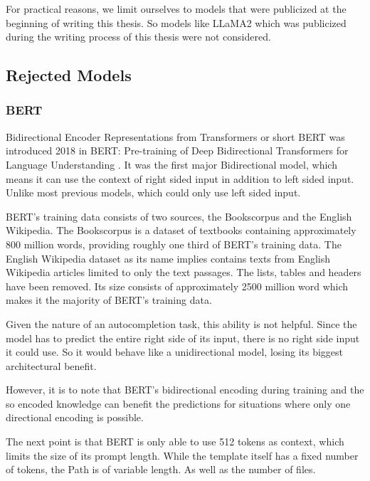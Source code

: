 For practical reasons, we limit ourselves to models that were publicized at the beginning of writing this thesis. So models like LLaMA2 which was publicized during the writing process of this thesis were not considered.



\subsection{Rejected Models}


\subsubsection{BERT}
Bidirectional Encoder Representations from Transformers or short BERT was introduced  2018  in BERT: Pre-training of Deep Bidirectional Transformers for
Language Understanding \cite{devlin2019bert}. It was the first major Bidirectional model, which means it can use the context of right sided input in addition to left sided input. Unlike most previous models, which could only use left sided input.

 
 BERT's training data consists of two sources, the Bookscorpus and the English Wikipedia. The Bookscorpus is a dataset of textbooks containing approximately 800 million words, providing roughly one third of BERT's training data. The English Wikipedia dataset as its name implies contains texts from English Wikipedia articles limited to only the text passages. The lists, tables and headers have been removed.
Its size consists of approximately 2500 million word which makes it the majority of BERT's training data. \cite{devlin2019bert}


 Given the nature of an autocompletion task, this ability is not helpful. Since the model has to predict the entire right side of its input, there is no right side input it could use. So it would behave like a unidirectional model, losing its biggest architectural benefit.
 
However, it is to note that BERT's bidirectional encoding during training and the so encoded knowledge can benefit the predictions  for situations where only one directional encoding is possible.

The next point is that BERT is only able to use 512 tokens as context, which limits the size of its prompt length. While the template itself has a fixed number of tokens, the Path is of variable length. As well as the number of files.




